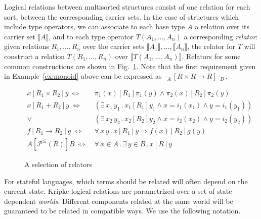 \documentclass[sigplan,10pt,review,anonymous]{acmart}\settopmatter{printfolios=true,printccs=false,printacmref=false}
\newcommand{\ifr}[1]{\mathrel{[{#1}]}}
\begin{document}
Logical relations between multisorted structures
consist of one relation for each sort,
between the corresponding carrier sets.
In the case of structures which include type operators,
we can associate to each base type $A$
a relation over its carrier set $\llbracket A \rrbracket$,
and to each type operator $T(A_1, \ldots, A_n)$
a corresponding \emph{relator}:
given relations $R_1, \ldots, R_n$ over
the carrier sets $\llbracket A_1 \rrbracket, \ldots, \llbracket A_n \rrbracket$,
the relator for $T$
will construct a relation $T(R_1, \ldots, R_n)$
over $\llbracket T(A_1, \ldots, A_n) \rrbracket$.
Relators for some common constructions are shown in Fig.~\ref{fig:relators}.
Note that the first requirement given in Example~\ref{ex:monoid} above
can be expressed as
$
  \cdot_A \ifr{R \times R \rightarrow R} \cdot_B
$.

\begin{figure} %
  {\small
  \begin{align*}
    x \ifr{R_1 \times R_2} y \ \Leftrightarrow\  &
      \pi_1(x) \ifr{R_1} \pi_1(y) \wedge
      \pi_2(x) \ifr{R_2} \pi_2(y) \\
    x \ifr{R_1 + R_2} y \ \Leftrightarrow\  &
      (\exists \, x_1 \, y_1 \,.\,
        x_1 \ifr{R_1} y_1 \wedge
        x = i_1(x_1) \wedge
        y = i_1(y_1)) \\ \vee\ &
      (\exists \, x_2 \, y_2 \,.\,
        x_2 \ifr{R_2} y_2 \wedge
        x = i_2(x_2) \wedge
        y = i_2(y_2)) \\
    f \ifr{R_1 \rightarrow R_2} g \ \Leftrightarrow\  &
      \forall \, x \, y \,.\,
        x \ifr{R_1} y \Rightarrow
        f(x) \ifr{R_2} g(y) \\
    A \ifr{\mathcal{P}^\le(R)} B \ \Leftrightarrow\  &
      \forall \, x \in A \,.\,
      \exists \, y \in B \,.\,
      x \ifr{R} y
  \end{align*}
  }%
  \caption{A selection of relators}
  \label{fig:relators}
\end{figure}


For stateful languages,
which terms should be related
will often depend on the current state.
Kripke logical relations
are parametrized over a set of state-dependent \emph{worlds}.
Different components related at the same world
will be guaranteed to be related in compatible ways.
We use the following notation.
\end{document}
